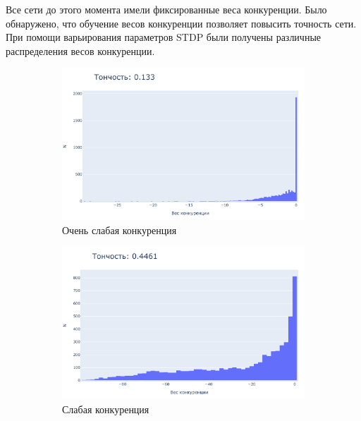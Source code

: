 \documentclass[a4paper]{article}
\begin{document}
Все сети до этого момента имели фиксированные веса конкуренции. Было обнаружено, что обучение весов конкуренции позволяет повысить точность сети. При помощи варьирования параметров STDP были получены различные распределения весов конкуренции.

\begin{figure}
\centering
\begin{subfigure}{0.2\textwidth}
    \includegraphics[width=\textwidth,keepaspectratio=true]{competition_distribution_worst_ru.pdf}
    \caption{Очень слабая конкуренция}
\end{subfigure}
\begin{subfigure}{0.2\textwidth}
    \includegraphics[width=\textwidth,keepaspectratio=true]{competition_distribution_medium_bad_ru.pdf}
    \caption{Слабая конкуренция}
\end{subfigure}
\\
\begin{subfigure}{0.22\textwidth}

\end{subfigure}
\end{figure}
\end{document}
